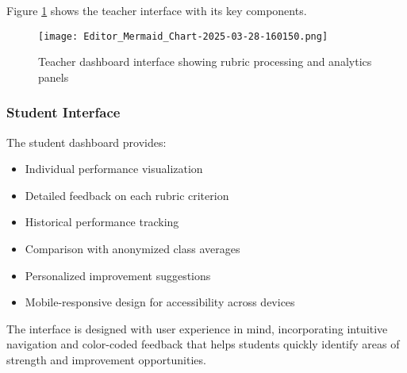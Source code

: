 \documentclass[12pt]{article}
\begin{document}

Figure \ref{fig:teacher_dashboard} shows the teacher interface with its key components.

\begin{figure}[H]
    \centering
    \texttt{[image: Editor\_Mermaid\_Chart-2025-03-28-160150.png]}
    \caption{Teacher dashboard interface showing rubric processing and analytics panels}
    \label{fig:teacher_dashboard}
\end{figure}

\subsubsection{Student Interface}
The student dashboard provides:
\begin{itemize}
    \item Individual performance visualization
    \item Detailed feedback on each rubric criterion
    \item Historical performance tracking
    \item Comparison with anonymized class averages
    \item Personalized improvement suggestions
    \item Mobile-responsive design for accessibility across devices
\end{itemize}

The interface is designed with user experience in mind, incorporating intuitive navigation and color-coded feedback that helps students quickly identify areas of strength and improvement opportunities.


\end{document}
\end{itemize}
\end{document}
